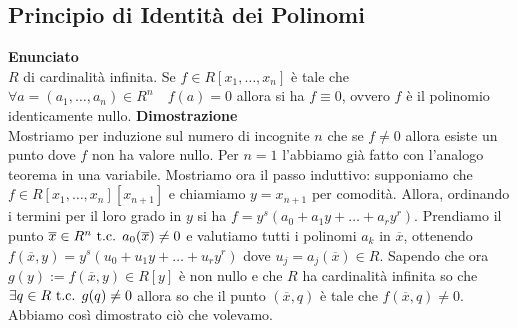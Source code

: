 \documentclass[a4paper,NoNotes,GeneralMath]{stdmdoc}
\newcommand{\Enunciato}{\vskip 0.05cm \noindent \textbf{Enunciato} \\ }
\renewcommand{\Dimostrazione}{\vskip 0.05cm \noindent \textbf{Dimostrazione} \\ }
\renewcommand{\bar}{\overline}
\begin{document}
	\subsection{Principio di Identità dei Polinomi}
	\Enunciato $R$ di cardinalità infinita. Se $f \in R[x_1, \ldots, x_n]$ è tale che $\forall a = (a_1, \ldots, a_n) \in R^n \quad f(a) = 0$ allora si ha $f \equiv 0$, ovvero $f$ è il polinomio identicamente nullo.
	\Dimostrazione Mostriamo per induzione sul numero di incognite $n$ che se $f \neq 0$ allora esiste un punto dove $f$ non ha valore nullo. Per $n=1$ l'abbiamo già fatto con l'analogo teorema in una variabile. Mostriamo ora il passo induttivo: supponiamo che $f \in R[x_1, \ldots, x_n][x_{n+1}]$ e chiamiamo $y = x_{n+1}$ per comodità. Allora, ordinando i termini per il loro grado in $y$ si ha $f = y^s (a_0 + a_1 y + \ldots + a_r y^r)$. Prendiamo il punto $\bar{x} \in R^n \tc a_0(\bar{x}) \neq 0$ e valutiamo tutti i polinomi $a_k$ in $\bar{x}$, ottenendo $f(\bar{x}, y) = y^s (u_0 + u_1 y + \ldots + u_r y^r)$ dove $u_j = a_j(\bar{x}) \in R$. Sapendo che ora $g(y) := f(\bar{x}, y) \in R[y]$ è non nullo e che $R$ ha cardinalità infinita so che $\exists q \in R \mbox{ t.c. } g(q) \neq 0$ allora so che il punto $(\bar{x}, q)$ è tale che $f(\bar{x}, q) \neq 0$. Abbiamo così dimostrato ciò che volevamo.
\end{document}
